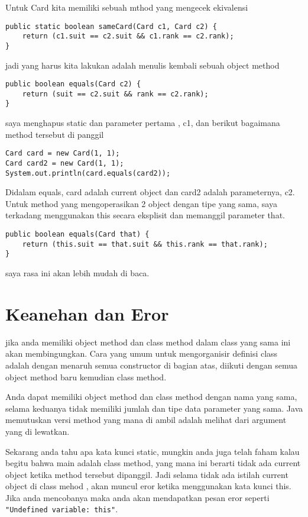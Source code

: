 Untuk Card kita memiliki sebuah mthod yang mengecek ekivalensi 
\begin{lstlisting}
public static boolean sameCard(Card c1, Card c2) {
	return (c1.suit == c2.suit && c1.rank == c2.rank);
}
\end{lstlisting}

jadi yang harus kita lakukan adalah menulis kembali sebuah object method 
\begin{lstlisting}
public boolean equals(Card c2) {
	return (suit == c2.suit && rank == c2.rank);
}
\end{lstlisting}

saya menghapus static dan parameter pertama , c1, dan berikut bagaimana method tersebut di panggil
\begin{lstlisting}
Card card = new Card(1, 1);
Card card2 = new Card(1, 1);
System.out.println(card.equals(card2));
\end{lstlisting}

Didalam equals, card adalah current object dan card2 adalah parameternya, c2. Untuk method yang mengoperasikan 2 object dengan tipe yang sama, saya terkadang menggunakan this secara eksplisit dan memanggil parameter that. 
\begin{lstlisting}
public boolean equals(Card that) {
	return (this.suit == that.suit && this.rank == that.rank);
}
\end{lstlisting}

saya rasa ini akan lebih mudah di baca.


\section{Keanehan dan Eror} %

jika anda memiliki object method dan class method dalam class yang sama ini akan membingungkan. Cara yang umum untuk mengorganisir definisi class adalah dengan menaruh semua constructor di bagian atas, diikuti dengan semua object method baru kemudian class method. 

Anda dapat memiliki object method dan class method dengan nama yang sama, selama keduanya tidak memiliki jumlah dan tipe data parameter yang sama. Java memutuskan versi method yang mana di ambil adalah melihat dari argument yang di lewatkan.

Sekarang anda tahu apa kata kunci static, mungkin anda juga telah faham kalau begitu bahwa main adalah class method, yang mana ini berarti tidak ada current object ketika method tersebut dipanggil. Jadi selama tidak ada istilah current object di class mehod , akan muncul eror ketika menggunakan kata kunci this. Jika anda mencobanya maka anda akan mendapatkan pesan eror seperti \texttt{"Undefined variable: this"}.

